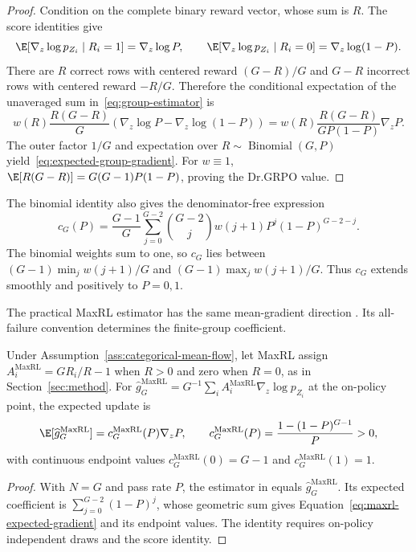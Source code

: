 \begin{proof}
\enforcehalffinalproseline
Condition on the complete binary reward vector, whose sum is $R$. The score
identities give
\[
  \E[\nabla_z\log p_{Z_i}\mid R_i=1]=\nabla_z\log P,
  \qquad
  \E[\nabla_z\log p_{Z_i}\mid R_i=0]
  =\nabla_z\log(1-P).
\]
There are $R$ correct rows with centered reward $(G-R)/G$ and $G-R$
incorrect rows with centered reward $-R/G$. Therefore the conditional
expectation of the unaveraged sum in~\eqref{eq:group-estimator} is
\[
  w(R)\frac{R(G-R)}{G}
  \left(\nabla_z\log P-\nabla_z\log(1-P)\right)
  =w(R)\frac{R(G-R)}{GP(1-P)}\nabla_zP.
\]
The outer factor $1/G$ and expectation over
$R\sim\operatorname{Binomial}(G,P)$ yield~\eqref{eq:expected-group-gradient}.
For $w\equiv1$,
$\E[R(G-R)]=G(G-1)P(1-P)$, proving the Dr.GRPO value.
\end{proof}

The binomial identity also gives the denominator-free expression
\[
 c_G(P)=\frac{G-1}{G}\sum_{j=0}^{G-2}\binom{G-2}{j}
 w(j+1)P^j(1-P)^{G-2-j}.
\]
The binomial weights sum to one, so $c_G$ lies between
$(G-1)\min_j w(j+1)/G$ and $(G-1)\max_j w(j+1)/G$.
Thus $c_G$ extends smoothly and positively to $P=0,1$.

The practical MaxRL estimator has the same mean-gradient direction
\citep[Section~4.3 and App.~D, Theorem~5]{tajwar2026maxrl}. Its all-failure
convention determines the finite-group coefficient.

\begin{lemma}
\enforcehalffinalproseline
\label{lem:maxrl-mean}
Under Assumption~\ref{ass:categorical-mean-flow}, let MaxRL assign
$A_i^{\mathrm{MaxRL}}=GR_i/R-1$ when $R>0$ and zero when $R=0$, as in
Section~\ref{sec:method}. For
$\widehat g_G^{\mathrm{MaxRL}}=G^{-1}\sum_i
 A_i^{\mathrm{MaxRL}}\nabla_z\log p_{Z_i}$ at the on-policy point, the
expected update is
\begin{equation}
  \E[\widehat g_G^{\mathrm{MaxRL}}]
  =c_G^{\mathrm{MaxRL}}(P)\nabla_zP,
  \qquad
  c_G^{\mathrm{MaxRL}}(P)
  =\frac{1-(1-P)^{G-1}}{P}>0,
  \label{eq:maxrl-expected-gradient}
\end{equation}
with continuous endpoint values
$c_G^{\mathrm{MaxRL}}(0)=G-1$ and
$c_G^{\mathrm{MaxRL}}(1)=1$.
\end{lemma}

\begin{proof}
\enforcehalffinalproseline
With $N=G$ and pass rate $P$, the estimator in
\citet[Theorem~5]{tajwar2026maxrl} equals
$\widehat g_G^{\mathrm{MaxRL}}$. Its expected coefficient is
$\sum_{j=0}^{G-2}(1-P)^j$, whose geometric sum gives
Equation~\eqref{eq:maxrl-expected-gradient} and its endpoint values.
The identity requires on-policy independent draws and the score identity.
\end{proof}

